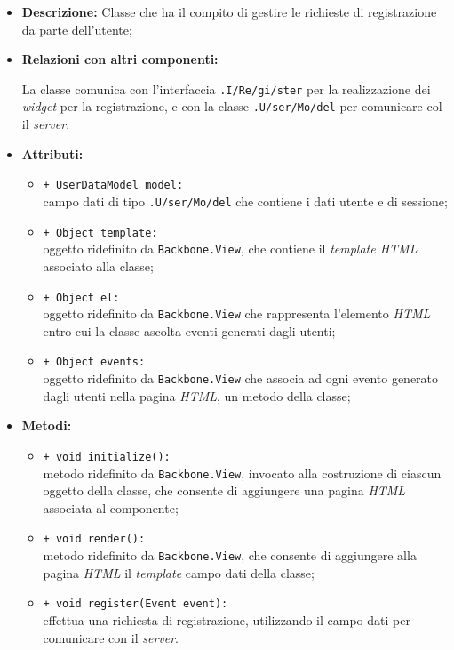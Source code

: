 \begin{flushleft}
\begin{itemize}
\item \textbf{Descrizione:} Classe che ha il compito di gestire le richieste di registrazione da parte dell'utente;
\item \textbf{Relazioni con altri componenti:}
\begin{sloppypar}
La classe comunica con l'interfaccia \texttt{\viewUser{}.I\fshyp{}Re\fshyp{}gi\fshyp{}ster} per la realizzazione dei \textit{widget} per la registrazione, e con la classe \texttt{\model{}.U\fshyp{}ser\fshyp{}Mo\fshyp{}del} per comunicare col il \textit{server}.
\end{sloppypar}
\item \textbf{Attributi:}
\begin{sloppypar}
\begin{itemize}
\item \texttt{+ UserDataModel model:}\\ campo dati di tipo \texttt{\model{}.U\fshyp{}ser\fshyp{}Mo\fshyp{}del} che contiene i dati utente e di sessione;
\item \texttt{+ Object template:}\\ oggetto ridefinito da \texttt{Backbone.View}, che contiene il \textit{template HTML} associato alla classe;
\item \texttt{+ Object el:}\\ oggetto ridefinito da \texttt{Backbone.View} che rappresenta l'elemento \textit{HTML} entro cui la classe ascolta eventi generati dagli utenti;
\item \texttt{+ Object events:}\\ oggetto ridefinito da \texttt{Backbone.View} che associa ad ogni evento generato dagli utenti nella pagina \textit{HTML}, un metodo della classe;
\end{itemize}
\end{sloppypar}
\item \textbf{Metodi:}
\begin{sloppypar}
\begin{itemize}
\item \texttt{+ void initialize():}\\ metodo ridefinito da \texttt{Backbone.View}, invocato alla costruzione di ciascun oggetto della classe, che consente di aggiungere una pagina \textit{HTML} associata al componente;
\item \texttt{+ void render():}\\ metodo ridefinito da \texttt{Backbone.View}, che consente di aggiungere alla pagina \textit{HTML} il \textit{template} campo dati della classe;
\item \texttt{+ void register(Event event):}\\ effettua una richiesta di registrazione, utilizzando il campo dati \model{} per comunicare con il \textit{server}.
\end{itemize}
\end{sloppypar}
\end{itemize}
\end{flushleft}

